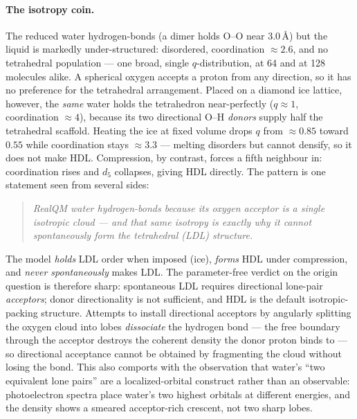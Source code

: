 \documentclass[11pt]{article}
\begin{document}
\paragraph{The isotropy coin.} The reduced water hydrogen-bonds (a dimer holds O--O near $3.0$\,\AA)
but the liquid is markedly under-structured: disordered, coordination $\approx 2.6$, and no
tetrahedral population --- one broad, single $q$-distribution, at 64 and at 128 molecules alike. A
spherical oxygen accepts a proton from any direction, so it has no preference for the tetrahedral
arrangement. Placed on a diamond ice lattice, however, the \emph{same} water holds the tetrahedron
near-perfectly ($q \approx 1$, coordination $\approx 4$), because its two directional O--H
\emph{donors} supply half the tetrahedral scaffold. Heating the ice at fixed volume drops $q$ from
$\approx 0.85$ toward $0.55$ while coordination stays $\approx 3.3$ --- melting disorders but cannot
densify, so it does not make HDL. Compression, by contrast, forces a fifth neighbour in:
coordination rises and $d_5$ collapses, giving HDL directly. The pattern is one statement seen from
several sides:

\begin{quote}\itshape
RealQM water hydrogen-bonds because its oxygen acceptor is a single isotropic cloud --- and that
same isotropy is exactly why it cannot spontaneously form the tetrahedral (LDL) structure.
\end{quote}

The model \emph{holds} LDL order when imposed (ice), \emph{forms} HDL under compression, and
\emph{never spontaneously} makes LDL. The parameter-free verdict on the origin question is therefore
sharp: spontaneous LDL requires directional lone-pair \emph{acceptors}; donor directionality is not
sufficient, and HDL is the default isotropic-packing structure. Attempts to install directional
acceptors by angularly splitting the oxygen cloud into lobes \emph{dissociate} the hydrogen bond ---
the free boundary through the acceptor destroys the coherent density the donor proton binds to ---
so directional acceptance cannot be obtained by fragmenting the cloud without losing the bond. This
also comports with the observation that water's ``two equivalent lone pairs'' are a localized-orbital
construct rather than an observable: photoelectron spectra place water's two highest orbitals at
different energies, and the density shows a smeared acceptor-rich crescent, not two sharp lobes.
\end{document}
